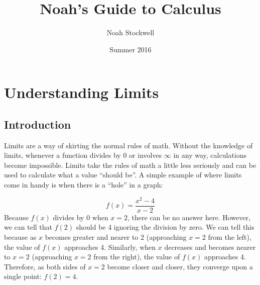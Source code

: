 \documentclass[]{article}
\title{Noah's Guide to Calculus}
\author{Noah Stockwell}
\date{Summer 2016}
\begin{document}
\maketitle
\vspace{2in}
\begin{center}
\end{center}
\newpage
\tableofcontents
\newpage
\section{Understanding Limits}
\subsection{Introduction} Limits are a way of skirting the normal rules of math. Without the knowledge of limits, whenever a function divides by 0 or involves $\infty$ in any way, calculations become impossible. Limits take the rules of math a little less seriously and can be used to calculate what a value ``should be''. A simple example of where limits come in handy is when there is a ``hole'' in a graph:
\begin{center}
\end{center}
$$f(x)=\frac{x^2-4}{x-2}$$
Because $f(x)$ divides by 0 when $x=2$, there can be no answer here. However, we can tell that $f(2)$ should be 4 ignoring the division by zero. We can tell this because as $x$ becomes greater and nearer to 2 (approaching $x=2$ from the left), the value of $f(x)$ approaches 4. Similarly, when $x$ decreases and becomes nearer to $x=2$ (approaching $x=2$ from the right), the value of $f(x)$ approaches 4. Therefore, as both sides of $x=2$ become closer and closer, they converge upon a single point: $f(2)=4$.
\end{document}
